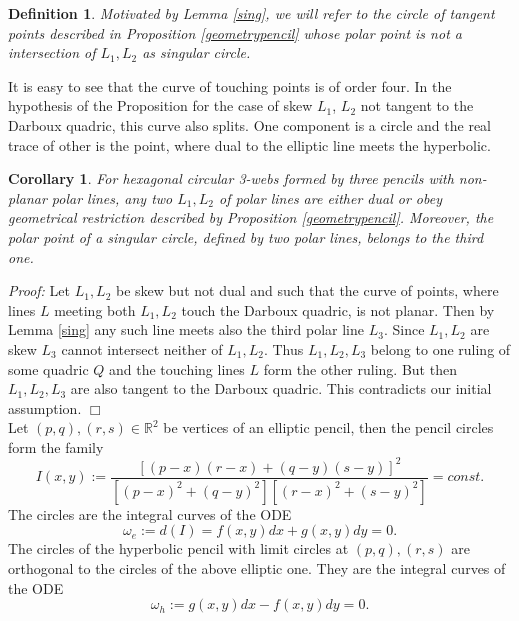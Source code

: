 \documentclass[11pt,a4paper]{article}
\newtheorem{corollary}[theorem]{Corollary}
\newtheorem{definition}{Definition}
\begin{document}
\begin{definition}
 Motivated by Lemma \ref{sing}, we will refer to the circle of tangent points described in Proposition \ref{geometrypencil} whose polar point is not a  intersection of $L_1,L_2$ as {\it singular circle}. 
\end{definition}
 
 It is easy to see that the curve of touching points is of order four. In the hypothesis of the Proposition for the case of skew $L_1$, $L_2$ not tangent to the Darboux quadric,  this curve also splits. One component  is a circle and the real trace of other is the  point,  where dual to the elliptic line meets the hyperbolic. 

\begin{corollary}\label{singcircle}
For hexagonal circular 3-webs  formed by three pencils with non-planar polar lines,
any two $L_1,L_2$ of polar lines are either dual  or obey geometrical restriction described by Proposition \ref{geometrypencil}. Moreover, the polar point of a singular circle, defined by two polar lines, belongs to the third one.   
\end{corollary}
{\it Proof:} Let $L_1,L_2$ be skew but not dual and such that the curve of points, where lines $L$ meeting both $L_1,L_2$ touch the Darboux quadric, is not planar. Then by Lemma \ref{sing} any such line meets also the third polar line $L_3$.  Since $L_1,L_2$ are skew $L_3$ cannot intersect neither of $L_1,L_2$. Thus $L_1,L_2,L_3$ belong to one ruling of some quadric $Q$ and the touching lines $L$ form the other ruling.  But then $L_1,L_2,L_3$ are also tangent to the Darboux quadric. This contradicts our initial assumption.       
\hfill $\Box$\\


 Let $(p,q),(r,s)\in \mathbb{R}^2$ be vertices of an elliptic pencil, then the pencil circles form the family 
$$
I(x,y):=\frac{[(p-x)(r-x)+(q-y)(s-y)]^2}{[(p-x)^2+(q-y)^2][(r-x)^2+(s-y)^2]}=const. 
$$
The circles are the integral curves of the ODE
\begin{equation}\label{elliptic}
\omega_e:=d(I)=f(x,y)dx+g(x,y)dy=0. 
\end{equation}
The circles of the hyperbolic pencil with limit circles at  $(p,q),(r,s)$ are orthogonal to the circles of the above elliptic one. They are the integral curves of the ODE  
\begin{equation}\label{hyperbolic}
\omega_h:=g(x,y)dx-f(x,y)dy=0. 
\end{equation}
\end{document}

